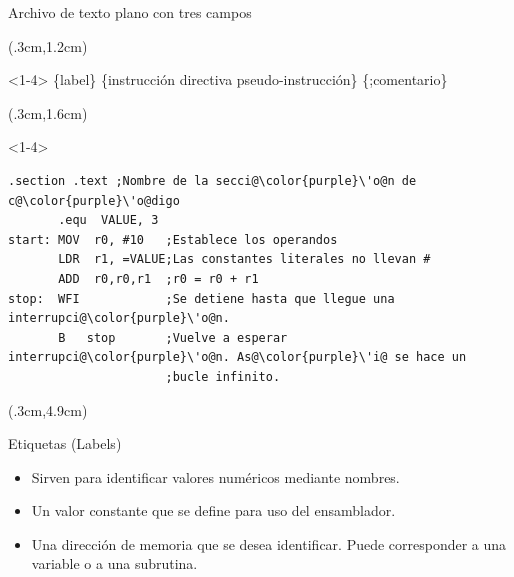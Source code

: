 \documentclass[usenames,table,dvipsnames,aspectratio=169]{beamer}
\begin{document}
\begin{frame}[fragile]{Archivo de texto plano con tres campos}
 \begin{textblock*}{\textwidth}(.3cm,1.2cm)
  \begin{onlyenv}<1-4>
   \{label\} \{instrucción \textbar directiva \textbar pseudo-instrucción\} \{;comentario\}
  \end{onlyenv}
 \end{textblock*}
 \begin{textblock*}{\textwidth}(.3cm,1.6cm)
  \begin{onlyenv}<1-4>
   \begin{lstlisting}[escapechar=\@,]
       .section .text ;Nombre de la secci@\color{purple}\'o@n de c@\color{purple}\'o@digo
       .equ  VALUE, 3     
start: MOV  r0, #10   ;Establece los operandos
       LDR  r1, =VALUE;Las constantes literales no llevan #
       ADD  r0,r0,r1  ;r0 = r0 + r1
stop:  WFI            ;Se detiene hasta que llegue una interrupci@\color{purple}\'o@n.
       B   stop       ;Vuelve a esperar interrupci@\color{purple}\'o@n. As@\color{purple}\'i@ se hace un 
                      ;bucle infinito. 
   \end{lstlisting}
  \end{onlyenv}
 \end{textblock*}
 \begin{textblock*}{\textwidth}(.3cm,4.9cm)
  \begin{block}{Etiquetas (Labels)}
   \begin{itemize}[<+(1)->] \justifying
    \item Sirven para identificar valores numéricos mediante nombres.
    \item Un valor constante que se define para uso del ensamblador.
    \item Una dirección de memoria que se desea identificar. Puede corresponder a una variable o a una subrutina.
   \end{itemize}
  \end{block}
 \end{textblock*}
\end{frame}
\end{document}
